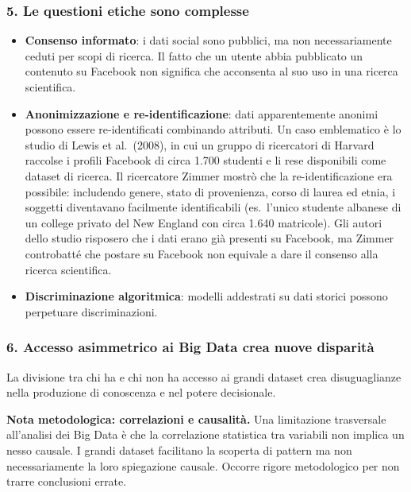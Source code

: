 \documentclass[12pt,a4paper]{article}
\begin{document}
\subsubsection{5. Le questioni etiche sono complesse}

\begin{itemize}
  \item \textbf{Consenso informato}: i dati social sono pubblici, ma non necessariamente
        ceduti per scopi di ricerca. Il fatto che un utente abbia pubblicato un contenuto
        su Facebook non significa che acconsenta al suo uso in una ricerca scientifica.
  \item \textbf{Anonimizzazione e re-identificazione}: dati apparentemente anonimi possono
        essere re-identificati combinando attributi. Un caso emblematico è lo studio di
        Lewis et al.\ (2008), in cui un gruppo di ricercatori di Harvard raccolse i profili
        Facebook di circa 1.700 studenti e li rese disponibili come dataset di ricerca.
        Il ricercatore Zimmer mostrò che la re-identificazione era possibile: includendo
        genere, stato di provenienza, corso di laurea ed etnia, i soggetti diventavano
        facilmente identificabili (es.\ l'unico studente albanese di un college privato
        del New England con circa 1.640 matricole). Gli autori dello studio risposero che
        i dati erano già presenti su Facebook, ma Zimmer controbatté che postare su
        Facebook non equivale a dare il consenso alla ricerca scientifica.
  \item \textbf{Discriminazione algoritmica}: modelli addestrati su dati storici possono
        perpetuare discriminazioni.
\end{itemize}

\subsubsection{6. Accesso asimmetrico ai Big Data crea nuove disparità}

La divisione tra chi ha e chi non ha accesso ai grandi dataset crea disuguaglianze nella
produzione di conoscenza e nel potere decisionale.

\medskip
\noindent\textbf{Nota metodologica: correlazioni e causalità.}
Una limitazione trasversale all'analisi dei Big Data è che la correlazione statistica tra
variabili non implica un nesso causale. I grandi dataset facilitano la scoperta di pattern
ma non necessariamente la loro spiegazione causale. Occorre rigore metodologico per non
trarre conclusioni errate.
\end{document}
